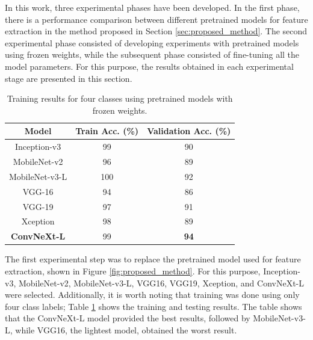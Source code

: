 \documentclass[mathematics,article,submit,pdftex,moreauthors]{Definitions/mdpi}
\begin{document}
In this work, three experimental phases have been developed. In the first phase, there is a performance comparison between different pretrained models for feature extraction in the method proposed in Section \ref{sec:proposed_method}. The second experimental phase consisted of developing experiments with pretrained models using frozen weights, while the subsequent phase consisted of fine-tuning all the model parameters. For this purpose, the results obtained in each experimental stage are presented in this section.

\begin{table}[ht!]
\centering
\caption{Training results for four classes using pretrained models with frozen weights.\label{tab:comparison_pretrained}}
\begin{tabular}{@{}ccc@{}}
\toprule
\textbf{Model}          & \textbf{Train Acc. (\%)}  & \textbf{Validation Acc. (\%)}     \\ \midrule
Inception-v3   & 99                 & 90               \\
MobileNet-v2   & 96                 & 89               \\
MobileNet-v3-L & 100                & 92              \\
VGG-16         & 94                 & 86              \\
VGG-19         & 97                 & 91              \\
Xception       & 98                 & 89               \\
\textbf{ConvNeXt-L}     & 99        & \textbf{94}           \\ \bottomrule
\end{tabular}
\end{table}

The first experimental step was to replace the pretrained model used for feature extraction, shown in Figure \ref{fig:proposed_method}. For this purpose, Inception-v3, MobileNet-v2, MobileNet-v3-L, VGG16, VGG19, Xception, and ConvNeXt-L were selected. Additionally, it is worth noting that training was done using only four class labels; Table \ref{tab:comparison_pretrained} shows the training and testing results. The table shows that the ConvNeXt-L model provided the best results, followed by MobileNet-v3-L, while VGG16, the lightest model, obtained the worst result.
\end{document}
